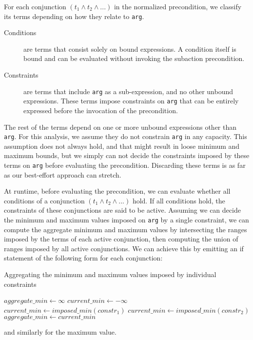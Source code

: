 For each conjunction $(t_1 \land t_2 \land ...)$ in the normalized precondition, we classify its terms depending on how they relate to \texttt{arg}.
\begin{description}
    \item [Conditions] are terms that consist solely on bound expressions. A condition itself is bound and can be evaluated without invoking the subaction precondition.
    \item [Constraints] are terms that include \texttt{arg} as a sub-expression, and no other unbound expressions.
    These terms impose constraints on \texttt{arg} that can be entirely expressed before the invocation of the precondition.
\end{description}
The rest of the terms depend on one or more unbound expressions other than \texttt{arg}.
For this analysis, we assume they do not constrain \texttt{arg} in any capacity.
This assumption does not always hold, and that might result in loose minimum and maximum bounds, but we simply can not decide the constraints imposed by these terms on \texttt{arg} before evaluating the precondition.
Discarding these terms is as far as our best-effort approach can stretch.

At runtime, before evaluating the precondition, we can evaluate whether all conditions of a conjunction $(t_1 \land t_2 \land ...)$ hold.
If all conditions hold, the constraints of these conjunctions are said to be active.
Assuming we can decide the minimum and maximum values imposed on \texttt{arg} by a single constraint, we can compute the aggregate minimum and maximum values by intersecting the ranges imposed by the terms of each active conjunction,
then computing the union of ranges imposed by all active conjunctions.
We can achieve this by emitting an if statement of the following form for each conjunction:

\begin{algorithm}[H]
    \caption{Aggregating the minimum and maximum values imposed by individual constraints}
    \begin{algorithmic}[1]
    \STATE $aggregate\_min \gets \infty$
            \STATE $current\_min \gets -\infty$
                \STATE $current\_min \gets imposed\_min(constr_1)$
            \ENDIF
                \STATE $current\_min \gets imposed\_min(constr_2)$
            \ENDIF
        \ENDIF
            \STATE $aggregate\_min \gets current\_min$
        \ENDIF
    \ENDFOR
    \end{algorithmic}
\end{algorithm}
and similarly for the maximum value.

